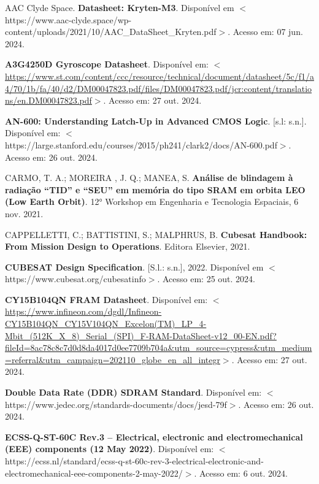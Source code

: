 \begin{flushleft}
\begin{thebibliography}{00} %
 AAC Clyde Space. \textbf{Datasheet: Kryten-M3}. Disponível em $<$https://www.aac-clyde.space/wp-content/uploads/2021/10/AAC\_DataSheet\_Kryten.pdf$>$.  Acesso em: 07 jun. 2024.

 \textbf{A3G4250D Gyroscope Datasheet}. Disponível em: $<$\url{https://www.st.com/content/ccc/resource/technical/document/datasheet/5c/f1/a4/70/1b/fa/40/d2/DM00047823.pdf/files/DM00047823.pdf/jcr:content/translations/en.DM00047823.pdf}$>$. Acesso em: 27 out. 2024. 

 \textbf{AN-600: Understanding Latch-Up in Advanced CMOS Logic}. [s.l: s.n.]. Disponível em: $<$https://large.stanford.edu/courses/2015/ph241/clark2/docs/AN-600.pdf$>$. Acesso em: 26 out. 2024.


 CARMO, T. A.; MOREIRA , J. Q.; MANEA, S. \textbf{Análise de blindagem à radiação “TID” e “SEU” em memória do tipo SRAM em orbita LEO (Low Earth Orbit)}. 12° Workshop em Engenharia e Tecnologia Espaciais, 6 nov. 2021.

 CAPPELLETTI, C.; BATTISTINI, S.; MALPHRUS, B. \textbf{Cubesat Handbook: From Mission Design to Operations}. Editora Elsevier, 2021.

 \textbf{CUBESAT Design Specification}. [S.l.: s.n.], 2022. Disponível em $<$https://www.cubesat.org/cubesatinfo$>$. Acesso em: 25 out. 2024.

 \textbf{CY15B104QN FRAM Datasheet}. Disponível em: $<$\url{https://www.infineon.com/dgdl/Infineon-CY15B104QN\_CY15V104QN\_Excelon(TM)\_LP\_4-Mbit\_(512K\_X\_8)\_Serial\_(SPI)\_F-RAM-DataSheet-v12\_00-EN.pdf?fileId=8ac78c8c7d0d8da4017d0ee7709b704a\&utm\_source=cypress\&utm\_medium=referral\&utm\_campaign=202110\_globe\_en\_all\_integr}$>$. Acesso em: 27 out. 2024.

 \textbf{Double Data Rate (DDR) SDRAM Standard}. Disponível em: $<$https://www.jedec.org/standards-documents/docs/jesd-79f$>$. Acesso em: 26 out. 2024.

 \textbf{ECSS-Q-ST-60C Rev.3 – Electrical, electronic and electromechanical (EEE) components (12 May 2022)}. Disponível em: $<$https://ecss.nl/standard/ecss-q-st-60c-rev-3-electrical-electronic-and-electromechanical-eee-components-2-may-2022/$>$. Acesso em: 6 out. 2024.


\end{thebibliography}
\end{flushleft}
